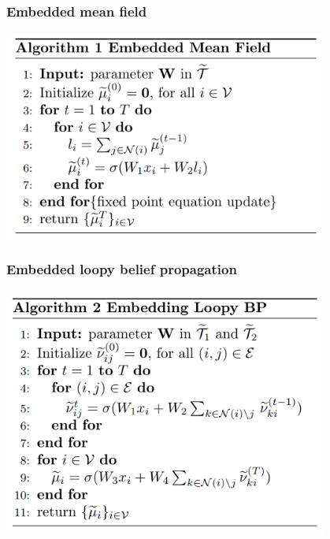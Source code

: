 \documentclass{beamer}
\begin{document}
%


    \begin{frame}
        \frametitle{Embedded mean field}
        \begin{center}
            \includegraphics[width=0.8\textwidth]{emf.png}
        \end{center}
    \end{frame}

    \begin{frame}
        \frametitle{Embedded loopy belief propagation}
        \begin{center}
            \includegraphics[width=0.8\textwidth]{elbp.png}
        \end{center}
    \end{frame}
\end{document}
